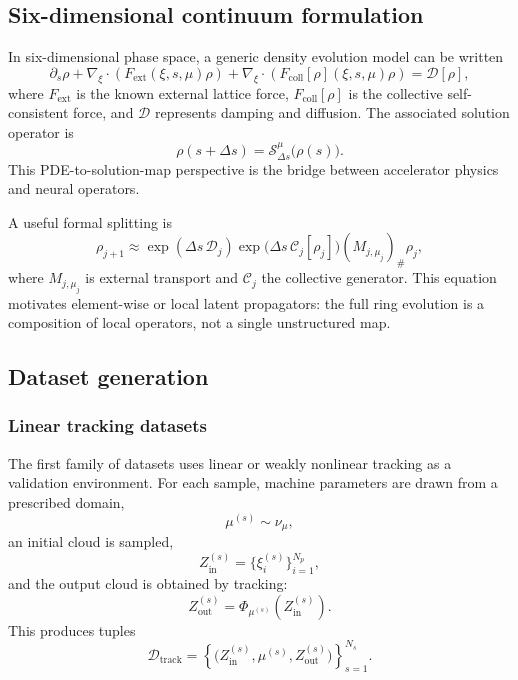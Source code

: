 \documentclass[11pt,a4paper]{article}
\begin{document}
\begin{sloppypar}
\subsection{Six-dimensional continuum formulation}
In six-dimensional phase space, a generic density evolution model can be written
\begin{equation}
    \partial_s\rho
    +
    \nabla_\xi\cdot\left(F_{\mathrm{ext}}(\xi,s,\mu)\rho\right)
    +
    \nabla_\xi\cdot\left(F_{\mathrm{coll}}[\rho](\xi,s,\mu)\rho\right)
    =
    \mathcal{D}[\rho],
    \label{eq:sixd_density_pde}
\end{equation}
where $F_{\mathrm{ext}}$ is the known external lattice force, $F_{\mathrm{coll}}[\rho]$ is the collective self-consistent force, and $\mathcal{D}$ represents damping and diffusion. The associated solution operator is
\begin{equation}
    \rho(s+\Delta s)=\mathcal{S}_{\Delta s}^{\mu}\big(\rho(s)\big).
    \label{eq:pde_solution_operator}
\end{equation}
This PDE-to-solution-map perspective is the bridge between accelerator physics and neural operators.

A useful formal splitting is
\begin{equation}
    \rho_{j+1}
    \approx
    \exp(\Delta s\,\mathcal{D}_{j})
    \exp\big(\Delta s\,\mathcal{C}_{j}[\rho_j]\big)
    (M_{j,\mu_j})_\#\rho_j,
    \label{eq:operator_splitting_main}
\end{equation}
where $M_{j,\mu_j}$ is external transport and $\mathcal{C}_{j}$ the collective generator. This equation motivates element-wise or local latent propagators: the full ring evolution is a composition of local operators, not a single unstructured map.

\subsection{Dataset generation}
\subsubsection{Linear tracking datasets}
The first family of datasets uses linear or weakly nonlinear tracking as a validation environment. For each sample, machine parameters are drawn from a prescribed domain,
\begin{equation}
    \mu^{(s)}\sim \nu_\mu,
\end{equation}
an initial cloud is sampled,
\begin{equation}
    Z_{\mathrm{in}}^{(s)}=\{\xi_i^{(s)}\}_{i=1}^{N_p},
\end{equation}
and the output cloud is obtained by tracking:
\begin{equation}
    Z_{\mathrm{out}}^{(s)}=\Phi_{\mu^{(s)}}\left(Z_{\mathrm{in}}^{(s)}\right).
\end{equation}
This produces tuples
\begin{equation}
    \mathcal{D}_{\mathrm{track}}
    =
    \left\{
    \big(Z_{\mathrm{in}}^{(s)},\mu^{(s)},Z_{\mathrm{out}}^{(s)}\big)
    \right\}_{s=1}^{N_s}.
    \label{eq:linear_tracking_dataset}
\end{equation}


\end{sloppypar}
\end{document}
